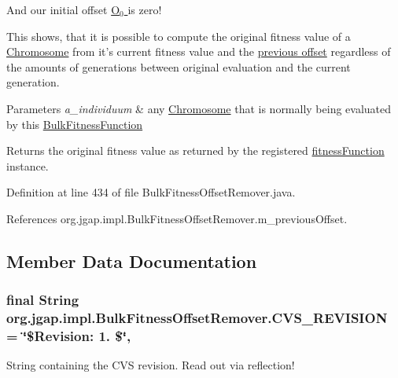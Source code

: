 \begin{DoxyPre}And our initial offset \hyperlink{classorg_1_1jgap_1_1impl_1_1_bulk_fitness_offset_remover_a6741e29abe529b43b2e61d3301a1ce3c}{O$_{\mbox{0}}$ } is zero!
\end{DoxyPre}
 

This shows, that it is possible to compute the original fitness value of a \hyperlink{classorg_1_1jgap_1_1_chromosome}{Chromosome} from it's current fitness value and the \hyperlink{classorg_1_1jgap_1_1impl_1_1_bulk_fitness_offset_remover_a6741e29abe529b43b2e61d3301a1ce3c}{previous offset} regardless of the amounts of generations between original evaluation and the current generation. 


\begin{DoxyParams}{Parameters}
{\em a\-\_\-individuum} & any \hyperlink{classorg_1_1jgap_1_1_chromosome}{Chromosome} that is normally being evaluated by this {\ttfamily \hyperlink{classorg_1_1jgap_1_1_bulk_fitness_function}{Bulk\-Fitness\-Function}} \\
\hline
\end{DoxyParams}
\begin{DoxyReturn}{Returns}
the original fitness value as returned by the registered \hyperlink{classorg_1_1jgap_1_1impl_1_1_bulk_fitness_offset_remover_a146b2858f31e684e3bec61818a32f730}{fitness\-Function} instance. 
\end{DoxyReturn}


Definition at line 434 of file Bulk\-Fitness\-Offset\-Remover.\-java.



References org.\-jgap.\-impl.\-Bulk\-Fitness\-Offset\-Remover.\-m\-\_\-previous\-Offset.



\subsection{Member Data Documentation}
\hypertarget{classorg_1_1jgap_1_1impl_1_1_bulk_fitness_offset_remover_a5a306d0059b248c4b2282b633e49f878}{
\subsubsection[{C\-V\-S\-\_\-\-R\-E\-V\-I\-S\-I\-O\-N}]{\setlength{\rightskip}{0pt plus 5cm}final String org.\-jgap.\-impl.\-Bulk\-Fitness\-Offset\-Remover.\-C\-V\-S\-\_\-\-R\-E\-V\-I\-S\-I\-O\-N = \char`\"{}\$Revision\-: 1. \$\char`\"{}\hspace{0.3cm}{\ttfamily [static]}, {\ttfamily [private]}}}\label{classorg_1_1jgap_1_1impl_1_1_bulk_fitness_offset_remover_a5a306d0059b248c4b2282b633e49f878}
String containing the C\-V\-S revision. Read out via reflection! 

